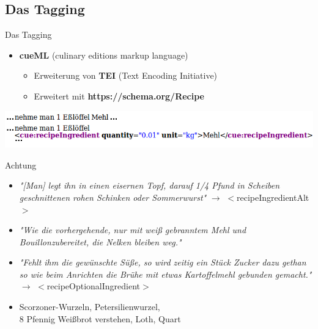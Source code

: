 \documentclass[12pt]{beamer}
\begin{document}
\subsection{Das Tagging}
\begin{frame}{Das Tagging}
	\begin{itemize}
		\item \textbf{cueML} (culinary editions markup language)
		\begin{itemize}
			\item Erweiterung von \textbf{TEI} (Text Encoding Initiative)
			\item Erweitert mit \textbf{https://schema.org/Recipe}
		\end{itemize}
	\end{itemize}
	\includegraphics[scale=0.45]{Images/TagBeispiel}
\end{frame}

\begin{frame}{Achtung}
	\begin{itemize}
		\item \textit{"[Man] legt ihn in einen eisernen Topf, darauf 1/4 Pfund in Scheiben geschnittenen rohen Schinken oder Sommerwurst"} $\rightarrow$ \textcolor{lila}{$<$recipeIngredientAlt$>$}
		\item \textit{"Wie die vorhergehende, nur mit weiß gebranntem Mehl und Bouillonzubereitet, die Nelken bleiben weg."}
		\item \textit{"Fehlt ihm die gewünschte Süße, so wird zeitig ein Stück Zucker dazu gethan so wie beim Anrichten die Brühe mit etwas Kartoffelmehl gebunden gemacht."} \\ $\rightarrow$ \textcolor{lila}{$<$recipeOptionalIngredient$>$}
		\item Scorzoner-Wurzeln, Petersilienwurzel, \\
		8 Pfennig Weißbrot verstehen, Loth, Quart
	\end{itemize}
\end{frame}
\end{document}
